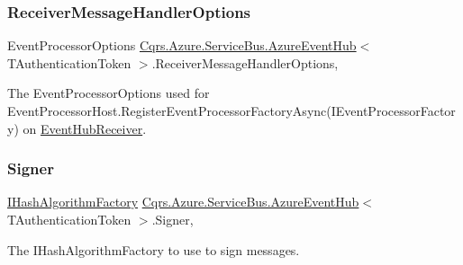 \subsubsection{\texorpdfstring{Receiver\+Message\+Handler\+Options}{ReceiverMessageHandlerOptions}}
{\footnotesize\ttfamily Event\+Processor\+Options \hyperlink{classCqrs_1_1Azure_1_1ServiceBus_1_1AzureEventHub}{Cqrs.\+Azure.\+Service\+Bus.\+Azure\+Event\+Hub}$<$ T\+Authentication\+Token $>$.Receiver\+Message\+Handler\+Options\hspace{0.3cm}{\ttfamily [get]}, {\ttfamily [protected]}}



The Event\+Processor\+Options used for Event\+Processor\+Host.\+Register\+Event\+Processor\+Factory\+Async(\+I\+Event\+Processor\+Factory) on \hyperlink{classCqrs_1_1Azure_1_1ServiceBus_1_1AzureEventHub_a1b12b47dbb9b9afe2014477a2e457c35_a1b12b47dbb9b9afe2014477a2e457c35}{Event\+Hub\+Receiver}. 

\mbox{\label{classCqrs_1_1Azure_1_1ServiceBus_1_1AzureEventHub_a001a89909f92a45909cb95c2c0acf9fa_a001a89909f92a45909cb95c2c0acf9fa}} 
\subsubsection{\texorpdfstring{Signer}{Signer}}
{\footnotesize\ttfamily \hyperlink{interfaceCqrs_1_1Bus_1_1IHashAlgorithmFactory}{I\+Hash\+Algorithm\+Factory} \hyperlink{classCqrs_1_1Azure_1_1ServiceBus_1_1AzureEventHub}{Cqrs.\+Azure.\+Service\+Bus.\+Azure\+Event\+Hub}$<$ T\+Authentication\+Token $>$.Signer\hspace{0.3cm}{\ttfamily [get]}, {\ttfamily [protected]}}



The I\+Hash\+Algorithm\+Factory to use to sign messages. 

\mbox{\label{classCqrs_1_1Azure_1_1ServiceBus_1_1AzureEventHub_a7dcae4b6bcae81e87b935892e6687382_a7dcae4b6bcae81e87b935892e6687382}} 
